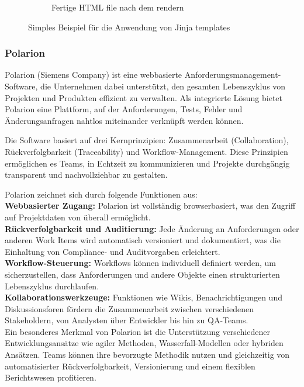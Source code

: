 \documentclass[a4paper, 12pt]{article}
\begin{document}
\begin{figure}[H]
\begin{subfigure}{0.6\textwidth}
        \caption{Fertige HTML file nach dem rendern}
        \label{fig:jinja_fertige_html_file}
    \end{subfigure}

    \caption{Simples Beispiel für die Anwendung von Jinja templates}
    \label{fig:jinja_example}
\end{figure}

\subsubsection{Polarion}\label{polarion}
Polarion (Siemens Company) ist eine webbasierte Anforderungsmanagement-Software, die Unternehmen dabei unterstützt, den gesamten Lebenszyklus von Projekten und Produkten effizient zu verwalten. Als integrierte Lösung bietet Polarion eine Plattform, auf der Anforderungen, Tests, Fehler und Änderungsanfragen nahtlos miteinander verknüpft werden können.

Die Software basiert auf drei Kernprinzipien: Zusammenarbeit (Collaboration), Rückverfolgbarkeit (Traceability) und Workflow-Management. Diese Prinzipien ermöglichen es Teams, in Echtzeit zu kommunizieren und Projekte durchgängig transparent und nachvollziehbar zu gestalten.

Polarion zeichnet sich durch folgende Funktionen aus:\\
\textbf{Webbasierter Zugang:} Polarion ist vollständig browserbasiert, was den Zugriff auf Projektdaten von überall ermöglicht.\\
\textbf{Rückverfolgbarkeit und Auditierung:} Jede Änderung an Anforderungen oder anderen Work Items wird automatisch versioniert und dokumentiert, was die Einhaltung von Compliance- und Auditvorgaben erleichtert.\\
\textbf{Workflow-Steuerung:} Workflows können individuell definiert werden, um sicherzustellen, dass Anforderungen und andere Objekte einen strukturierten Lebenszyklus durchlaufen.\\
\textbf{Kollaborationswerkzeuge:} Funktionen wie Wikis, Benachrichtigungen und Diskussionsforen fördern die Zusammenarbeit zwischen verschiedenen Stakeholdern, von Analysten über Entwickler bis hin zu QA-Teams.\\
Ein besonderes Merkmal von Polarion ist die Unterstützung verschiedener Entwicklungsansätze wie agiler Methoden, Wasserfall-Modellen oder hybriden Ansätzen. Teams können ihre bevorzugte Methodik nutzen und gleichzeitig von automatisierter Rückverfolgbarkeit, Versionierung und einem flexiblen Berichtswesen profitieren.
\end{document}
